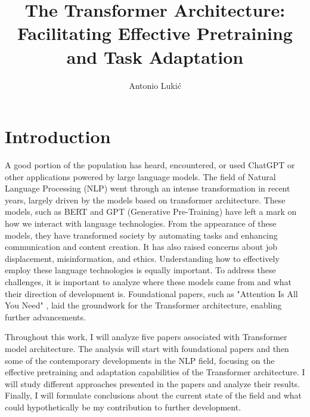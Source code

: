 \documentclass[times, utf8, seminar]{fer}
\begin{document}
\title{The Transformer Architecture: Facilitating Effective Pretraining and Task Adaptation}

\author{Antonio Lukić}


\maketitle

\tableofcontents

\chapter{Introduction}
A good portion of the population has heard, encountered, or used ChatGPT or other applications powered by large language models. The field of Natural Language Processing (NLP) went through an intense transformation in recent years, largely driven by the models based on transformer architecture. These models, such as BERT \citep{devlin2018bert} and GPT (Generative Pre-Training) \citep{radford2018improving} have left a mark on how we interact with language technologies. From the appearance of these models, they have transformed society by automating tasks and enhancing communication and content creation. It has also raised concerns about job displacement, misinformation, and ethics. Understanding how to effectively employ these language technologies is equally important. To address these challenges, it is important to analyze where these models came from and what their direction of development is. Foundational papers, such as "Attention Is All You Need" \citep{vaswani2017attention}, laid the groundwork for the Transformer architecture, enabling further advancements.


Throughout this work, I will analyze five papers associated with Transformer model architecture. The analysis will start with foundational papers and then some of the contemporary developments in the NLP field, focusing on the effective pretraining and adaptation capabilities of the Transformer architecture. I will study different approaches presented in the papers and analyze their results. Finally, I will formulate conclusions about the current state of the field and what could hypothetically be my contribution to further development.
\end{document}
